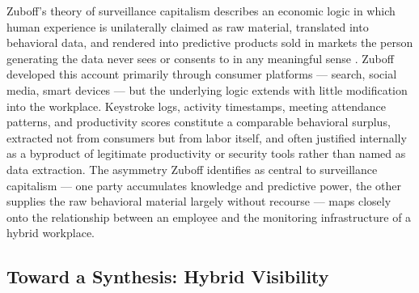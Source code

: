 \documentclass[10pt]{article}
\begin{document}
Zuboff's theory of surveillance capitalism describes an economic logic in which human experience is unilaterally claimed as raw material, translated into behavioral data, and rendered into predictive products sold in markets the person generating the data never sees or consents to in any meaningful sense \cite{zuboff}. Zuboff developed this account primarily through consumer platforms --- search, social media, smart devices --- but the underlying logic extends with little modification into the workplace. Keystroke logs, activity timestamps, meeting attendance patterns, and productivity scores constitute a comparable behavioral surplus, extracted not from consumers but from labor itself, and often justified internally as a byproduct of legitimate productivity or security tools rather than named as data extraction. The asymmetry Zuboff identifies as central to surveillance capitalism --- one party accumulates knowledge and predictive power, the other supplies the raw behavioral material largely without recourse --- maps closely onto the relationship between an employee and the monitoring infrastructure of a hybrid workplace.

\subsection{Toward a Synthesis: Hybrid Visibility}
\end{document}
